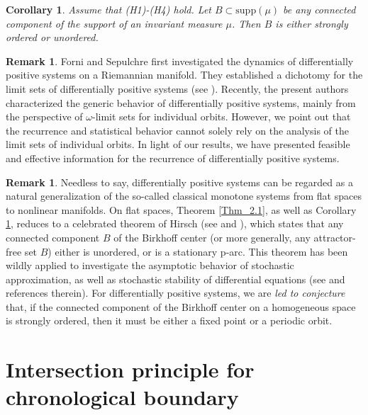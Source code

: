 \documentclass[a4paper,11pt]{article}
\theoremstyle{plain}
\newtheorem{cor}[thm]{Corollary}
\theoremstyle{definition}
\newtheorem{rmk}[thm]{Remark}
\numberwithin{equation}{section}
\begin{document}
\vskip 3mm

\begin{cor}\label{Thm_2.2}
	Assume that  {\rm (H1)-(H4)} hold. Let $B\subset\text{supp} (\mu)$ be any connected component of the support of an invariant measure $\mu$. Then $B$ is either strongly ordered or unordered.
\end{cor}	


\vskip 3mm


\begin{rmk}
	Forni and Sepulchre \cite{ForniandSepulchre16} first investigated the dynamics of differentially positive systems on a Riemannian manifold. They established a dichotomy for the limit sets of differentially positive systems (see \cite[Theorem 4]{ForniandSepulchre16}). Recently,	the present authors \cite{NW25,NWZ26} characterized the generic behavior of differentially positive systems, mainly from the perspective of $\omega$-limit sets for individual orbits. 
	However, we point out that  the recurrence and statistical behavior cannot solely rely on the	analysis of the limit sets of individual orbits. In light of our results, we have presented feasible and effective information for the recurrence of differentially positive systems.
\end{rmk}
	
	
	
\begin{rmk}
	Needless to say, differentially positive systems can be regarded as a natural generalization of the so-called classical monotone systems from flat spaces to nonlinear manifolds. On flat spaces, Theorem \ref{Thm_2.1}, as well as Corollary \ref{Thm_2.2}, reduces to a celebrated theorem of Hirsch (see \cite[Theorem 1.6]{H99} and \cite{Mi00}), which states that any connected component $B$ of the Birkhoff center (or more generally, any attractor-free set $B$) either is unordered, or is a stationary p-arc. This theorem has been wildly applied to investigate the asymptotic behavior of stochastic approximation, as well as stochastic stability of differential equations (see \cite{B00,BF21,BH99,JWS26} and references therein). For differentially positive systems, we are {\it led to conjecture} that, if the connected component of the Birkhoff center	on a homogeneous space is strongly ordered, then it must be either a fixed point or a periodic orbit. 
\end{rmk}
	
	

	
\noindent\section{Intersection principle for chronological boundary}\label{s3}
	
\end{document}
